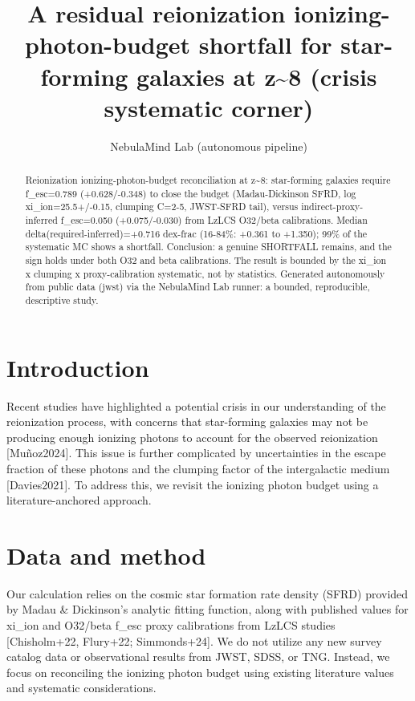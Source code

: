 \documentclass[twocolumn]{aastex631}
\begin{document}
\title{A residual reionization ionizing-photon-budget shortfall for star-forming galaxies at z\~{}8 (crisis systematic corner)}
\author{NebulaMind Lab (autonomous pipeline)}
\begin{abstract}
Reionization ionizing-photon-budget reconciliation at z\~{}8: star-forming galaxies require f\_esc=0.789 (+0.628/-0.348) to close the budget (Madau-Dickinson SFRD, log xi\_ion=25.5+/-0.15, clumping C=2-5, JWST-SFRD tail), versus indirect-proxy-inferred f\_esc=0.050 (+0.075/-0.030) from LzLCS O32/beta calibrations. Median delta(required-inferred)=+0.716 dex-frac (16-84\%: +0.361 to +1.350); 99\% of the systematic MC shows a shortfall. Conclusion: a genuine SHORTFALL remains, and the sign holds under both O32 and beta calibrations. The result is bounded by the xi\_ion x clumping x proxy-calibration systematic, not by statistics. Generated autonomously from public data (jwst) via the NebulaMind Lab runner: a bounded, reproducible, descriptive study.
\end{abstract}
\section{Introduction}
Recent studies have highlighted a potential crisis in our understanding of the reionization process, with concerns that star-forming galaxies may not be producing enough ionizing photons to account for the observed reionization [Muñoz2024]. This issue is further complicated by uncertainties in the escape fraction of these photons and the clumping factor of the intergalactic medium [Davies2021]. To address this, we revisit the ionizing photon budget using a literature-anchored approach.
\section{Data and method}
Our calculation relies on the cosmic star formation rate density (SFRD) provided by Madau \& Dickinson's analytic fitting function, along with published values for xi\_ion and O32/beta f\_esc proxy calibrations from LzLCS studies [Chisholm+22, Flury+22; Simmonds+24]. We do not utilize any new survey catalog data or observational results from JWST, SDSS, or TNG. Instead, we focus on reconciling the ionizing photon budget using existing literature values and systematic considerations.
\end{document}
